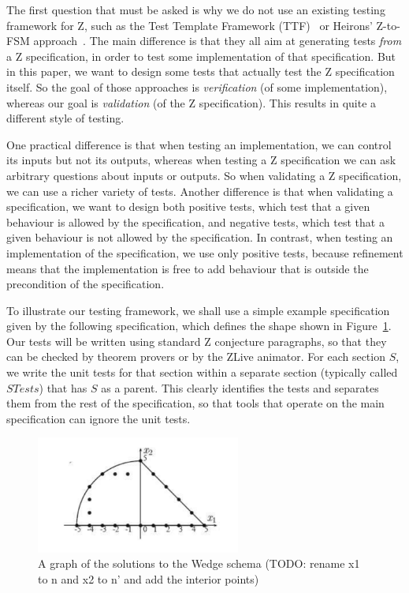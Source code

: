 \documentclass{llncs}
\begin{document}
The first question that must be asked is why we do not use an existing
testing framework for Z, such as the Test Template Framework
(TTF)~\cite{Stocks93,carrington94} or Heirons' Z-to-FSM
approach~\cite{hierons97}.  The main difference is that they all aim at
generating tests \emph{from} a Z specification, in order to test some
implementation of that specification.  But in this paper, we want to design
some tests that actually test the Z specification itself.  So the goal of
those approaches is \emph{verification} (of some implementation), whereas
our goal is \emph{validation} (of the Z specification).  This results in
quite a different style of testing.  

One practical difference is that when testing an implementation, we can
control its 
inputs but not its outputs, whereas when testing a Z specification we can
ask arbitrary questions about inputs or outputs.  So when validating a Z
specification, we can use a richer variety of tests.  Another difference is
that when validating a specification, we want to design both positive
tests, which test that a given behaviour is allowed by the specification,
and negative tests, which test that a given behaviour is not allowed by the
specification.  In contrast, when testing an implementation of the
specification, we use only positive tests, because refinement means that
the implementation is free to add behaviour that is outside the
precondition of the specification.

To illustrate our testing framework, we shall use a simple example
specification given by the following specification, which defines the
shape shown in Figure~\ref{fig:wedge}.  Our tests will be written
using standard Z conjecture paragraphs, so that they can be checked by
theorem provers or by the ZLive animator.  For each section $S$, we
write the unit tests for that section within a separate section
(typically called $STests$) that has $S$ as a parent.  This clearly
identifies the tests and separates them from the rest of the
specification, so that tools that operate on the main specification
can ignore the unit tests.

\begin{figure}[htbp]
  \centering
  \includegraphics[width=0.6\textwidth]{wedge}
  \caption{A graph of the solutions to the Wedge schema (TODO: rename x1 to n and x2 to n' and add the interior points)}
  \label{fig:wedge}
\end{figure}
\end{document}
